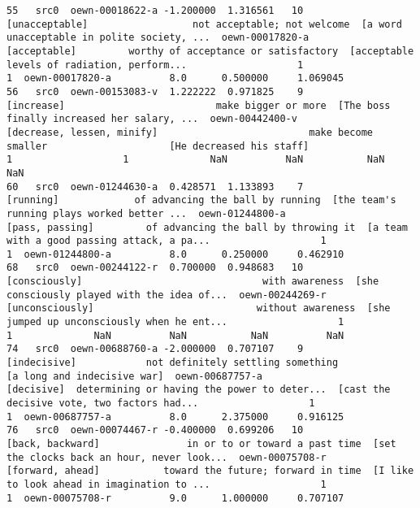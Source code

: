 \documentclass[a4paper,10pt,onecolumn,oneside,openright]{article}
\begin{document}
\begin{verbatim}
55   src0  oewn-00018622-a -1.200000  1.316561   10                               [unacceptable]                  not acceptable; not welcome  [a word unacceptable in polite society, ...  oewn-00017820-a                                 [acceptable]         worthy of acceptance or satisfactory  [acceptable levels of radiation, perform...                   1                   1  oewn-00017820-a          8.0      0.500000     1.069045
56   src0  oewn-00153083-v  1.222222  0.971825    9                                   [increase]                          make bigger or more  [The boss finally increased her salary, ...  oewn-00442400-v                   [decrease, lessen, minify]                          make become smaller                     [He decreased his staff]                   1                   1              NaN          NaN           NaN          NaN
60   src0  oewn-01244630-a  0.428571  1.133893    7                                    [running]             of advancing the ball by running  [the team's running plays worked better ...  oewn-01244800-a                              [pass, passing]         of advancing the ball by throwing it  [a team with a good passing attack, a pa...                   1                   1  oewn-01244800-a          8.0      0.250000     0.462910
68   src0  oewn-00244122-r  0.700000  0.948683   10                                [consciously]                               with awareness  [she consciously played with the idea of...  oewn-00244269-r                              [unconsciously]                            without awareness  [she jumped up unconsciously when he ent...                   1                   1              NaN          NaN           NaN          NaN
74   src0  oewn-00688760-a -2.000000  0.707107    9                                 [indecisive]            not definitely settling something                  [a long and indecisive war]  oewn-00687757-a                                   [decisive]  determining or having the power to deter...  [cast the decisive vote, two factors had...                   1                   1  oewn-00687757-a          8.0      2.375000     0.916125
76   src0  oewn-00074467-r -0.400000  0.699206   10                             [back, backward]               in or to or toward a past time  [set the clocks back an hour, never look...  oewn-00075708-r                             [forward, ahead]           toward the future; forward in time  [I like to look ahead in imagination to ...                   1                   1  oewn-00075708-r          9.0      1.000000     0.707107

\end{verbatim}
\end{document}
